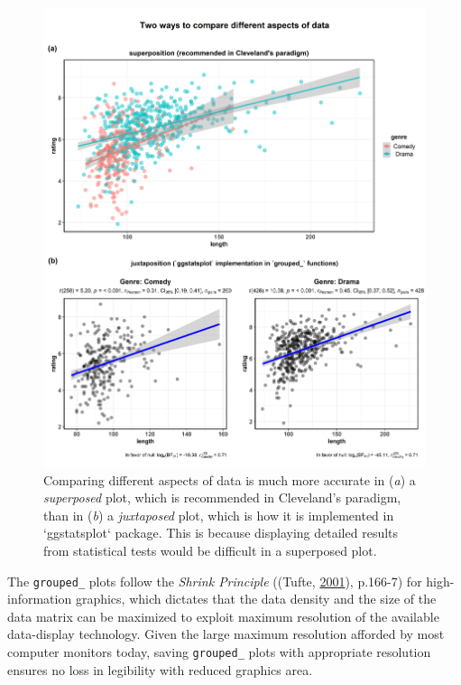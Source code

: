 \documentclass[]{article}
\begin{document}
\begin{figure}[H]
\includegraphics[width=1\linewidth]{./figures/paper-fig3-1} \caption{Comparing different aspects of data is much more accurate in (\textit{a}) a \textit{superposed} plot, which is recommended in Cleveland's paradigm, than in (\textit{b}) a \textit{juxtaposed} plot, which is how it is implemented in `ggstatsplot` package. This is because displaying detailed results from statistical tests would be difficult in a superposed plot.}\label{fig:fig3}
\end{figure}

The \texttt{grouped\_} plots follow the \emph{Shrink Principle}
((Tufte, \protect\hyperlink{ref-tufteVisualDisplayQuantitative2001}{2001}), p.166-7) for high-information graphics,
which dictates that the data density and the size of the data matrix can be
maximized to exploit maximum resolution of the available data-display
technology. Given the large maximum resolution afforded by most computer
monitors today, saving \texttt{grouped\_} plots with appropriate resolution ensures no
loss in legibility with reduced graphics area.
\end{document}
